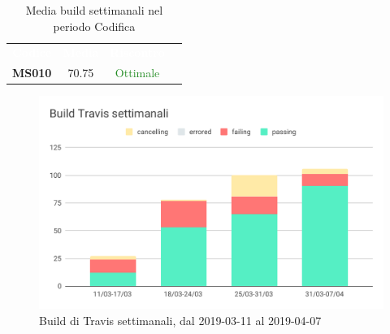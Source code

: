     \begin{table}[H]
        \centering
        \begin{tabular}{cccc}
        \rowcolor{greySWEight}
        \textcolor{white}{\textbf{Codice}} &
        \textcolor{white}{\textbf{Media}} &
        \textcolor{white}{\textbf{Riscontro}}\\
        \textbf{MS010}& 70.75 & \textcolor{ForestGreen}{Ottimale} \\
    
        \end{tabular}
        \caption{Media build settimanali nel periodo Codifica}
    \end{table}
    \begin{figure}[H]
        \centering
        \includegraphics[width=0.7\linewidth]{sez/App_Esito/Qualifica/graph/buildTravisSettimanale.pdf}
        \caption{Build di Travis settimanali, dal 2019-03-11 al 2019-04-07}
    \end{figure}

